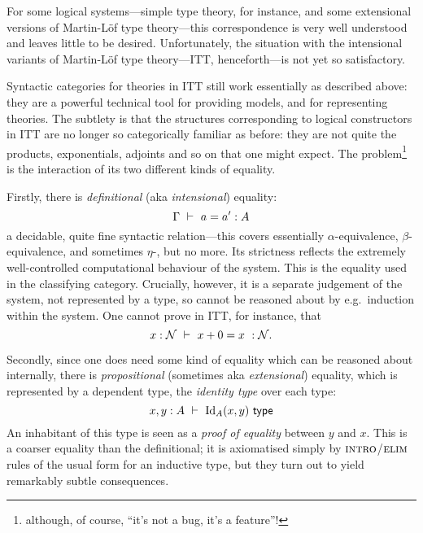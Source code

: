 \begin{para}
For some logical systems---simple type theory, for instance, and some extensional versions of Martin-Löf type theory---this correspondence is very well understood and leaves little to be desired.  Unfortunately, the situation with the intensional variants of Martin-Löf type theory---ITT, henceforth---is not yet so satisfactory.

Syntactic categories for theories in ITT still work essentially as described above: they are a powerful technical tool for providing models, and for representing theories.  The subtlety is that the structures corresponding to logical constructors in ITT are no longer so categorically familiar as before: they are not quite the products, exponentials, adjoints and so on that one might expect.  The problem\footnote{although, of course, ``it's not a bug, it's a feature''!} is the interaction of its two different kinds of equality.

Firstly, there is \emph{definitional} (aka \emph{intensional}) equality:
\[\Gamma\ \vdash\ a = a' : A\]
a decidable, quite fine syntactic relation---this covers essentially $\alpha$-equivalence, $\beta$-equivalence, and sometimes $\eta$-, but no more.  Its strictness reflects the extremely well-controlled computational behaviour of the system.  This is the equality used in the classifying category.  Crucially, however, it is a separate judgement of the system, not represented by a type, so cannot be reasoned about by e.g.\ induction within the system.  One cannot prove in ITT, for instance, that 
\[x : \mathcal{N}\ \vdash\ x+0 = x\ : \mathcal{N}. \]

Secondly, since one does need some kind of equality which can be reasoned about internally, there is \emph{propositional} (sometimes aka \emph{extensional}) equality, which is represented by a dependent type, the \emph{identity type} over each type:
\[ x, y : A\ \vdash\ \mathrm{Id}_A(x,y)\ \mathsf{type}\]
An inhabitant of this type is seen as a \emph{proof of equality} between $y$ and $x$.  This is a coarser equality than the definitional; it is axiomatised simply by $\textsc{intro}$/$\textsc{elim}$ rules of the usual form for an inductive type, but they turn out to yield remarkably subtle consequences.
\end{para}

